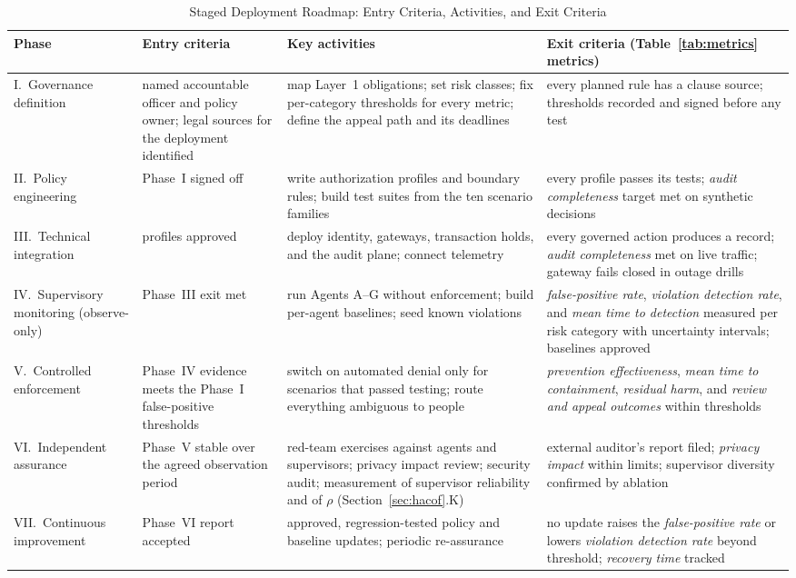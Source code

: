 \documentclass{ieeeaccess}
\begin{document}
\begin{table}[!t]
\caption{Staged Deployment Roadmap: Entry Criteria, Activities, and Exit Criteria}
\label{tab:roadmap}
\centering
\footnotesize
\setlength{\tabcolsep}{4pt}
\begin{tabular}{>{\raggedright\arraybackslash}p{2.3cm}>{\raggedright\arraybackslash}p{3.9cm}>{\raggedright\arraybackslash}p{5.0cm}>{\raggedright\arraybackslash}p{5.0cm}}
\toprule
\rowcolor{darkblue!15}
\textbf{Phase} & \textbf{Entry criteria} & \textbf{Key activities} & \textbf{Exit criteria (Table~\ref{tab:metrics} metrics)} \\
\midrule
I.\ Governance definition & named accountable officer and policy owner; legal sources for the deployment identified & map Layer~1 obligations; set risk classes; fix per-category thresholds for every metric; define the appeal path and its deadlines & every planned rule has a clause source; thresholds recorded and signed before any test \\
\rowcolor{darkblue!5}
II.\ Policy engineering & Phase~I signed off & write authorization profiles and boundary rules; build test suites from the ten scenario families & every profile passes its tests; \textit{audit completeness} target met on synthetic decisions \\
III.\ Technical integration & profiles approved & deploy identity, gateways, transaction holds, and the audit plane; connect telemetry & every governed action produces a record; \textit{audit completeness} met on live traffic; gateway fails closed in outage drills \\
\rowcolor{darkblue!5}
IV.\ Supervisory monitoring (observe-only) & Phase~III exit met & run Agents A--G without enforcement; build per-agent baselines; seed known violations & \textit{false-positive rate}, \textit{violation detection rate}, and \textit{mean time to detection} measured per risk category with uncertainty intervals; baselines approved \\
V.\ Controlled enforcement & Phase~IV evidence meets the Phase~I false-positive thresholds & switch on automated denial only for scenarios that passed testing; route everything ambiguous to people & \textit{prevention effectiveness}, \textit{mean time to containment}, \textit{residual harm}, and \textit{review and appeal outcomes} within thresholds \\
\rowcolor{darkblue!5}
VI.\ Independent assurance & Phase~V stable over the agreed observation period & red-team exercises against agents and supervisors; privacy impact review; security audit; measurement of supervisor reliability and of $\rho$ (Section~\ref{sec:hacof}.K) & external auditor's report filed; \textit{privacy impact} within limits; supervisor diversity confirmed by ablation \\
VII.\ Continuous improvement & Phase~VI report accepted & approved, regression-tested policy and baseline updates; periodic re-assurance & no update raises the \textit{false-positive rate} or lowers \textit{violation detection rate} beyond threshold; \textit{recovery time} tracked \\
\bottomrule
\end{tabular}
\end{table}
\end{document}
